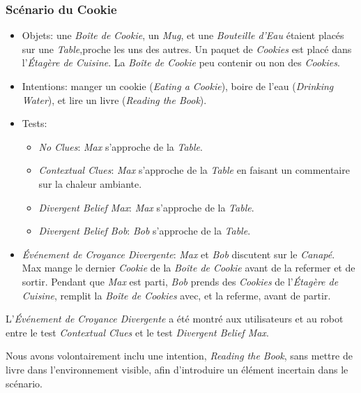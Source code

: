 \documentclass[a4paper,11pt,twoside]{StyleThese}
\begin{document}
\subsubsection{Scénario du Cookie}
\begin{itemize}
\item Objets: une \textit{Boîte de Cookie}, un \textit{Mug}, et une \textit{Bouteille d'Eau} étaient placés sur une \textit{Table},proche les uns des autres. Un paquet de \textit{Cookies} est placé dans l'\textit{Étagère de Cuisine}. La \textit{Boîte de Cookie} peu contenir ou non des \textit{Cookies}.
\item Intentions: manger un cookie (\textit{Eating a Cookie}), boire de l'eau (\textit{Drinking Water}), et lire un livre (\textit{Reading the Book}).
\item Tests:
\begin{itemize}
	\item \textit{No Clues}: \textit{Max} s'approche de la \textit{Table}.
    \item \textit{Contextual Clues}: \textit{Max} s'approche de la \textit{Table} en faisant un commentaire sur la chaleur ambiante.
	\item \textit{Divergent Belief Max}: \textit{Max} s'approche de la \textit{Table}.
	\item \textit{Divergent Belief Bob}: \textit{Bob} s'approche de la \textit{Table}.
\end{itemize}
\item  \textit{Événement de Croyance Divergente}:  \textit{Max} et \textit{Bob} discutent sur le \textit{Canapé}. Max mange le dernier \textit{Cookie} de la \textit{Boîte de Cookie} avant de la refermer et de sortir. Pendant que \textit{Max} est parti, \textit{Bob} prends des \textit{Cookies} de l'\textit{Étagère de Cuisine}, remplit la \textit{Boîte de Cookies} avec, et la referme, avant de partir.
\end{itemize}

L'\textit{Événement de Croyance Divergente} a été montré aux utilisateurs et au robot entre le test \textit{Contextual Clues} et le test \textit{Divergent Belief Max}. 

Nous avons volontairement inclu une intention, \textit{Reading the Book}, sans mettre de livre dans l'environnement visible, afin d'introduire un élément incertain dans le scénario.
\end{document}
